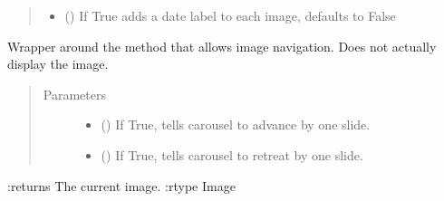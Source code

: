 \documentclass[letterpaper,10pt,english]{sphinxmanual}
\begin{document}
\begin{fulllineitems}
\begin{fulllineitems}
\begin{quote}
\begin{description}
\begin{itemize}
\item {} 
 (\sphinxstyleliteralemphasis{\sphinxupquote{, }}) \textendash{} If True adds a date label to each image, defaults to False

\end{itemize}

\end{description}\end{quote}

\end{fulllineitems}


\begin{fulllineitems}
\label{\detokenize{polo.widgets:polo.widgets.slideshow_viewer.SlideshowViewer.carousel_controls}}
Wrapper around the {\hyperref[\detokenize{polo.widgets:polo.widgets.slideshow_viewer.Carousel.controls}]{}}
method that allows image navigation. Does not actually display the
image.
\begin{quote}\begin{description}
\item[{Parameters}] \leavevmode\begin{itemize}
\item {} 
 () \textendash{} If True, tells carousel to advance by one slide.

\item {} 
 () \textendash{} If True, tells carousel to retreat by one slide.

\end{itemize}

\end{description}\end{quote}

:returns The current image.
:rtype Image


\end{fulllineitems}
\end{fulllineitems}
\end{document}
